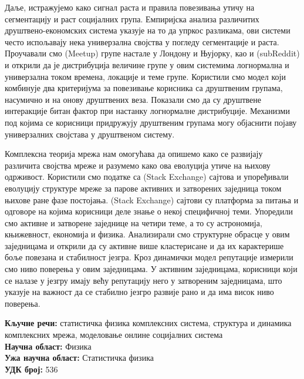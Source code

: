 Даље, истражујемо како сигнал раста и правила повезивања утичу на сегментацију и раст социјалних група. Емпиријска анализа различитих друштвено-економских система указује на то да упркос разликама, ови системи често испољавају нека универзална својства у погледу сегментације и раста. Проучавали смо {(Meetup)} групе настале у Лондону и Њујорку, као и {(subReddit)} и открили да је дистрибуција величине групе у овим системима логнормална и универзална током времена, локације и теме групе. Користили смо модел који комбинује два критеријума за повезивање корисника са друштвеним групама, насумично и на онову друштвених веза. Показали смо да су друштвене интеракције битан фактор при настанку логнормалне дистрибуције. Механизми под којима се корисници придружују друштвеним групама могу објаснити појаву универзалних својстава у друштвеном систему.

Комплексна теорија мрежа нам омогућава да опишемо како се развијају различита својства мреже и разумемо како ова еволуција утиче на њихову одрживост. Користили смо податке са {(Stack Exchange)} сајтова и упоређивали еволуцију структуре мреже за парове активних и затворених заједница током њихове ране фазе постојања. {(Stack Exchange)} сајтови су платформа за питања и одговоре на којима корисници деле знање о некој специфичној теми. Упоредили смо активне и затворене заједнице на четири теме, а то су астрономија, књижевност, економија и физика. Анализирали смо структурне обрасце у овим заједницама и открили да су активне више кластерисане и да их карактерише боље повезана и стабилност језгра. 
Кроз динамички модел репутације измерили смо ниво поверења у овим заједницама. У активним заједницама, корисници који се налазе у језгру имају већу репутацију него у затвореним заједницама, што указује на важност да се стабилно језгро развије рано и да има висок ниво поверења.

\noindent
\textbf{Кључне речи:} статистичка физика комплексних система, структура и динамика комплексних мрежа, моделовање онлине социјалних система \\
\textbf{Научна област:} Физика \\
\textbf{Ужа научна област:} Статистичка физика \\
\textbf{УДК број:} 536 %


\pagebreak
